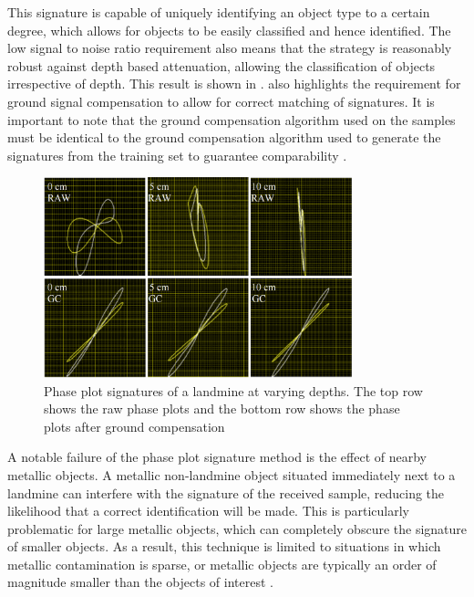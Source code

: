 \documentclass[main.tex]{subfiles}
\begin{document}
This signature is capable of uniquely identifying an object type to a certain degree, which allows for objects to be easily classified and hence identified. The low signal to noise ratio requirement also means that the strategy is reasonably robust against depth based attenuation, allowing the classification of objects irrespective of depth. This result is shown in .  also highlights the requirement for ground signal compensation to allow for correct matching of signatures. It is important to note that the ground compensation algorithm used on the samples must be identical to the ground compensation algorithm used to generate the signatures from the training set to guarantee comparability \parencite{Kruger2006}.
\begin{figure}[ht]
\includegraphics[width=0.8\textwidth]{2-LiteratureReview/compensated-signature.png}
\centering
\caption[Phase plot signatures of a landmine at varying depths]{Phase plot signatures of a landmine at varying depths. The top row shows the raw phase plots and the bottom row shows the phase plots after ground compensation \parencite{Kruger2006}} 
\end{figure}

A notable failure of the phase plot signature method is the effect of nearby metallic objects. A metallic non-landmine object situated immediately next to a landmine can interfere with the signature of the received sample, reducing the likelihood that a correct identification will be made. This is particularly problematic for large metallic objects, which can completely obscure the signature of smaller objects. As a result, this technique is limited to situations in which metallic contamination is sparse, or metallic objects are typically an order of magnitude smaller than the objects of interest \parencite{Kruger2006}.
\end{document}
